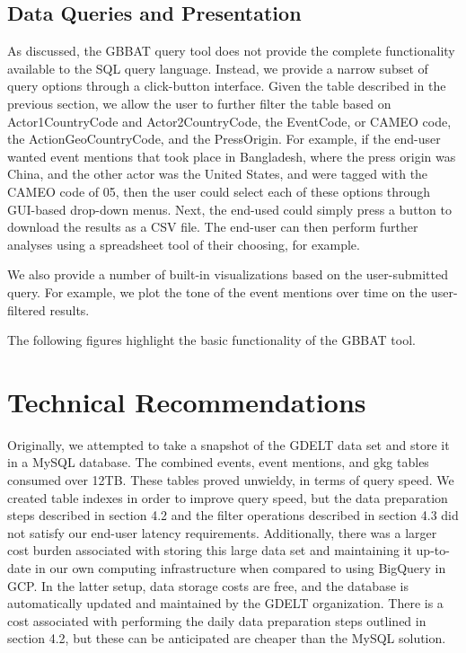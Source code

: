 \documentclass[preprint,authoryear,12pt]{elsarticle/elsarticle}
\begin{document}
\subsection{Data Queries and Presentation}
As discussed, the GBBAT query tool does not provide the complete functionality available to the SQL query language. Instead, we provide a narrow subset of query options through a click-button interface. Given the table described in the previous section, we allow the user to further filter the table based on Actor1CountryCode and Actor2CountryCode, the EventCode, or CAMEO code, the ActionGeoCountryCode, and the PressOrigin. For example, if the end-user wanted event mentions that took place in Bangladesh, where the press origin was China, and the other actor was the United States, and were tagged with the CAMEO code of 05, then the user could select each of these options through GUI-based drop-down menus. Next, the end-used could simply press a button to download the results as a CSV file. The end-user can then perform further analyses using a spreadsheet tool of their choosing, for example.

We also provide a number of built-in visualizations based on the user-submitted query. For example, we plot the tone of the event mentions over time on the user-filtered results. 

The following figures highlight the basic functionality of the GBBAT tool. 

\section{Technical Recommendations}
Originally, we attempted to take a snapshot of the GDELT data set and store it in a MySQL database. The combined events, event mentions, and gkg tables consumed over 12TB. These tables proved unwieldy, in terms of query speed. We created table indexes in order to improve query speed, but the data preparation steps described in section 4.2 and the filter operations described in section 4.3 did not satisfy our end-user latency requirements. Additionally, there was a larger cost burden associated with storing this large data set and maintaining it up-to-date in our own computing infrastructure when compared to using BigQuery in GCP. In the latter setup, data storage costs are free, and the database is automatically updated and maintained by the GDELT organization. There is a cost associated with performing the daily data preparation steps outlined in section 4.2, but these can be anticipated are cheaper than the MySQL solution.      
\end{document}
